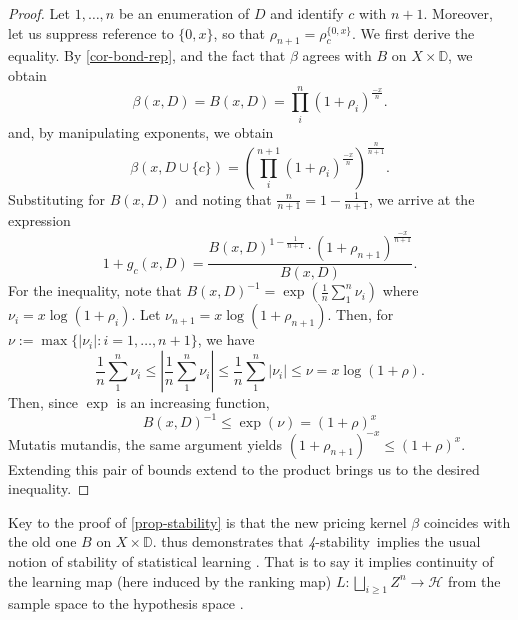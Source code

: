 \documentclass[ecta,nameyear,draft]{econsocart}
\newcommand{\mc}{\mathcal}
\newcommand{\mbbd}{{\mathds D}}
\newcommand{\stability}{\textit{4}-\textup{{stability}}}
\theoremstyle{plain}
\theoremstyle{remark}
\begin{document}
\begin{proof}
  Let $1, \dots, n$ be an enumeration of $D$ and identify $c$ with $n+1$.
  Moreover, let us suppress reference to $\{0, x\}$, so that $\rho_{n+1} =
  \rho_{c}^{\{0, x\}}$. We first derive the equality. By \cref{cor-bond-rep},
  and the fact that $\beta$ agrees with $B$ on $X \times \mbbd$, we obtain 
  \begin{equation*} \beta(x, D) = B(x, D) =
    \prod_{i}^{n} \left(1 + \rho_{i}\right)^\frac{-x}{n} .
  \end{equation*}
  and, by manipulating exponents, we obtain
  \begin{equation*}\beta(x, D \cup \{c\}) =
    \left(\prod_{i}^{n+1} \left(1 +
    \rho_{i}\right)^\frac{-x}{n}\right)^\frac{n}{n+1}.
  \end{equation*}
  Substituting for $B(x, D)$ and noting that $\frac{n}{n+1} = 1 -
  \frac{1}{n+1}$, we arrive at the expression
  \begin{equation*}
    1 + g_c(x, D) = \frac{B(x, D)^{1 - \frac{1}{n+1}} \cdot \left (1 +
    \rho_{n+1} \right)^\frac{-x}{n+1}}{B(x, D)}.  
  \end{equation*}
  For the inequality, note that $B(x, D)^{-1} = \exp(\frac{1}{n}\sum_{1}^{n}
  \nu_i)$ where $\nu_i = x\log(1+\rho_i)$. Let $\nu_{n+1} = x \log(1 +
  \rho_{n+1})$.  Then, for $\nu := \max\{\lvert \nu_i \rvert : i = 1, \dots,
  n+1\}$, we have
  \begin{equation*}
    \frac{1}{n}\sum_{1}^{n} \nu_i \leq \left \lvert \frac{1}{n}\sum_{1}^{n}
    \nu_i\right \rvert \leq \frac{1}{n} \sum_1^n \lvert \nu_i \rvert \leq \nu =
    x \log (1 + \rho).
  \end{equation*}
  Then, since $\exp$ is an increasing function,
  \begin{equation*}
    B(x, D)^{-1} \leq \exp (\nu) = (1 + \rho)^{x}
  \end{equation*}
  Mutatis mutandis, the same argument yields $(1 + \rho_{n+1})^{-x} \leq (1 +
  \rho)^{x}$. Extending this pair of bounds extend to the product brings us to
  the desired inequality. 
\end{proof}

Key to the proof of \cref{prop-stability} is that the new pricing kernel
$\beta$ coincides with the old one $B$ on $X \times \mbbd$.
 thus demonstrates that \stability\ implies the usual
notion of stability of statistical learning
\citep{poggio2004general,mukherjee2006learning,bousquet2002stability}. That is
to say it implies continuity of the learning map (here induced by the ranking
map) $L:\bigsqcup_{i \geq 1} Z^n \rightarrow \mc H$ from the sample space to
the hypothesis space \citep{mukherjee2006learning}.  
\end{document}
